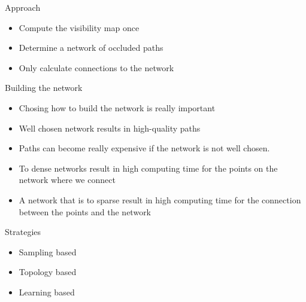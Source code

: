 \begin{frame}{Approach}
	\begin{itemize}
		\item Compute the visibility map once
		\item Determine a network of occluded paths
		\item Only calculate connections to the network
	\end{itemize}
\end{frame}

\begin{frame}{Building the network}
	\begin{itemize}
		\item Chosing how to build the network is really important
		\item Well chosen network results in high-quality paths
		\item Paths can become really expensive if the network is not well chosen.
		\item To dense networks result in high computing time for the points on the network where we connect
		\item A network that is to sparse result in high computing time for the connection between the points and the network
	\end{itemize}

\end{frame}

\begin{frame}{Strategies}
	\begin{itemize}
		\item Sampling based
		\item Topology based
		\item Learning based
	\end{itemize}

\end{frame}
